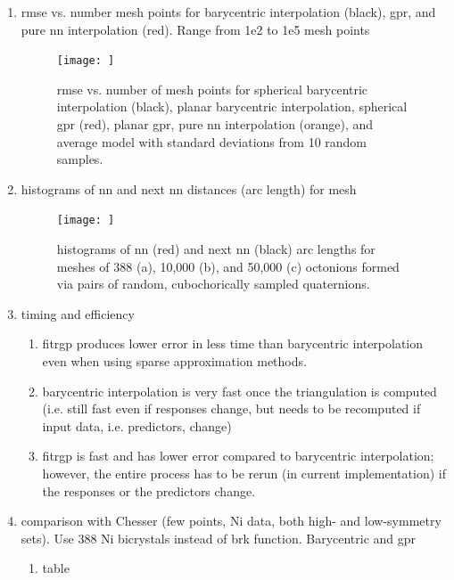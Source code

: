 \documentclass[preprint,12pt]{elsarticle}
\begin{document}
\begin{enumerate}
\begin{figure}
        \label{fig:brk-parity50000}
    \end{figure}
    \item \Gls{rmse} vs. number mesh points for barycentric interpolation (black), \gls{gpr}, and pure \gls{nn} interpolation (red). Range from 1e2 to 1e5 mesh points
    \begin{figure}
        \centering
        \texttt{[image: ]}
        \caption{\acrlong{rmse} vs. number of mesh points for spherical barycentric interpolation (black), planar barycentric interpolation, spherical \acrlong{gpr} (red), planar \gls{gpr}, pure \acrlong{nn} interpolation (orange), and average model with standard deviations from 10 random samples.}
        \label{fig:brk-rmse}
    \end{figure}
    \item histograms of \gls{nn} and next \gls{nn} distances (arc length) for mesh
    \begin{figure}
        \centering
        \texttt{[image: ]}
        \caption{histograms of \acrfull{nn} (red) and next \acrlong{nn} (black) arc lengths for meshes of 388 (a), 10,000 (b), and 50,000 (c) octonions formed via pairs of random, cubochorically sampled quaternions.}
        \label{fig:nndist}
    \end{figure}
    \item timing and efficiency
    \begin{enumerate}
        \item fitrgp produces lower error in less time than barycentric interpolation even when using sparse approximation methods.
        \item barycentric interpolation is very fast once the triangulation is computed (i.e. still fast even if responses change, but needs to be recomputed if input data, i.e. predictors, change)
        \item fitrgp is fast and has lower error compared to barycentric interpolation; however, the entire process has to be rerun (in current implementation) if the responses or the predictors change.
    \end{enumerate}
    \item comparison with Chesser \cite{Chesser2020LearningProperties} (few points, Ni data, both high- and low-symmetry sets). Use 388 Ni bicrystals instead of \gls{brk} function. Barycentric and \gls{gpr}
    \begin{enumerate}
        \item table
        \begin{table}[]

\end{table}
\end{enumerate}
\end{enumerate}
\end{document}
